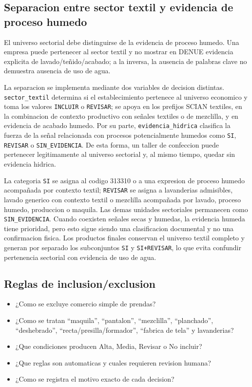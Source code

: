 \documentclass[11pt,letterpaper]{article}
\begin{document}
\subsection{Separacion entre sector textil y evidencia de proceso humedo}
\begin{alerta}
El universo sectorial debe distinguirse de la evidencia de proceso humedo. Una empresa puede pertenecer al sector textil y no mostrar en DENUE evidencia explicita de lavado/teñido/acabado; a la inversa, la ausencia de palabras clave no demuestra ausencia de uso de agua.
\end{alerta}

La separacion se implementa mediante dos variables de decision distintas. \texttt{sector\_textil} determina si el establecimiento pertenece al universo economico y toma los valores \texttt{INCLUIR} o \texttt{REVISAR}; se apoya en los prefijos SCIAN textiles, en la combinacion de contexto productivo con señales textiles o de mezclilla, y en evidencia de acabado humedo. Por su parte, \texttt{evidencia\_hidrica} clasifica la fuerza de la señal relacionada con procesos potencialmente humedos como \texttt{SI}, \texttt{REVISAR} o \texttt{SIN\_EVIDENCIA}. De esta forma, un taller de confeccion puede pertenecer legitimamente al universo sectorial y, al mismo tiempo, quedar sin evidencia hidrica.

La categoria \texttt{SI} se asigna al codigo 313310 o a una expresion de proceso humedo acompañada por contexto textil; \texttt{REVISAR} se asigna a lavanderias admisibles, lavado generico con contexto textil o mezclilla acompañada por lavado, proceso humedo, produccion o maquila. Las demas unidades sectoriales permanecen como \texttt{SIN\_EVIDENCIA}. Cuando coexisten señales secas y humedas, la evidencia humeda tiene prioridad, pero esto sigue siendo una clasificacion documental y no una confirmacion fisica. Los productos finales conservan el universo textil completo y generan por separado los subconjuntos \texttt{SI} y \texttt{SI+REVISAR}, lo que evita confundir pertenencia sectorial con evidencia de uso de agua.

\subsection{Reglas de inclusion/exclusion}
\begin{preguntas}
\begin{itemize}
    \item ¿Como se excluye comercio simple de prendas?
    \item ¿Como se tratan ``maquila'', ``pantalon'', ``mezclilla'', ``planchado'', ``deshebrado'', ``recta/presilla/formador'', ``fabrica de tela'' y lavanderias?
    \item ¿Que condiciones producen Alta, Media, Revisar o No incluir?
    \item ¿Que reglas son automaticas y cuales requieren revision humana?
    \item ¿Como se registra el motivo exacto de cada decision?
\end{itemize}
\end{preguntas}
\end{document}
